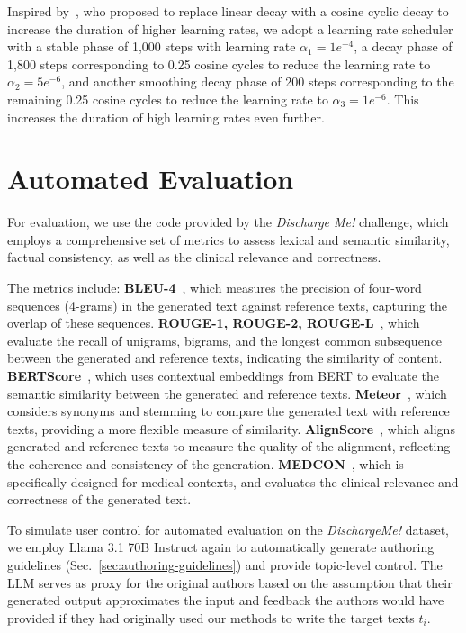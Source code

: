 Inspired by~\citet{hu2024minicpmunveilingpotentialsmall}, who proposed to replace linear decay with a cosine cyclic decay to increase the duration of higher learning rates, we adopt a learning rate scheduler with a stable phase of 1,000 steps with learning rate $\alpha_1 = 1e^{-4}$, a decay phase of 1,800 steps corresponding to 0.25 cosine cycles to reduce the learning rate to $\alpha_2 = 5e^{-6}$, and another smoothing decay phase of 200 steps corresponding to the remaining 0.25 cosine cycles to reduce the learning rate to $\alpha_3 = 1e^{-6}$. This increases the duration of high learning rates even further.


\section{Automated Evaluation}
\label{sec:automated-metrics-explanation}
For evaluation, we use the code provided by the \textit{Discharge Me!} challenge, which employs a comprehensive set of metrics to assess lexical and semantic similarity, factual consistency, as well as the clinical relevance and correctness.

The metrics include: \textbf{BLEU-4}~\citep{papineni-etal-2002-bleu}, which measures the precision of four-word sequences (4-grams) in the generated text against reference texts, capturing the overlap of these sequences.
\textbf{ROUGE-1, ROUGE-2, ROUGE-L}~\citep{lin-2004-rouge}, which evaluate the recall of unigrams, bigrams, and the longest common subsequence between the generated and reference texts, indicating the similarity of content.
\textbf{BERTScore}~\citep{zhang2020bertscoreevaluatingtextgeneration}, which uses contextual embeddings from BERT to evaluate the semantic similarity between the generated and reference texts.
\textbf{Meteor}~\citep{banerjee-lavie-2005-meteor}, which considers synonyms and stemming to compare the generated text with reference texts, providing a more flexible measure of similarity. 
\textbf{AlignScore}~\citep{zha-etal-2023-alignscore}, which aligns generated and reference texts to measure the quality of the alignment, reflecting the coherence and consistency of the generation.
\textbf{MEDCON}~\citep{Yim2023AcibenchAN}, which is specifically designed for medical contexts, and evaluates the clinical relevance and correctness of the generated text.

To simulate user control for automated evaluation on the \textit{DischargeMe!} dataset, we employ Llama 3.1 70B Instruct again to automatically generate authoring guidelines (Sec.~\ref{sec:authoring-guidelines}) and provide topic-level control. The LLM serves as proxy for the original authors based on the assumption that their generated output approximates the input and feedback the authors would have provided if they had originally used our methods to write the target texts $t_i$.

